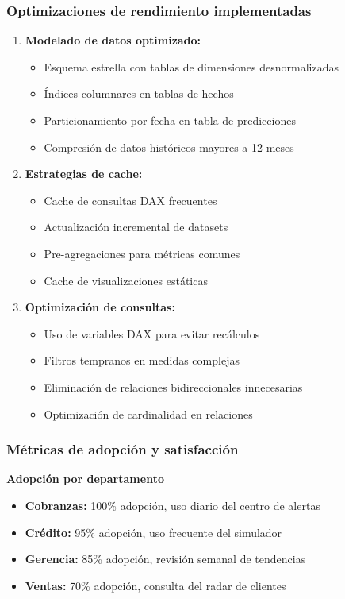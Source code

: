 \subsubsection{Optimizaciones de rendimiento implementadas}

\begin{enumerate}
    \item \textbf{Modelado de datos optimizado:}
    \begin{itemize}
        \item Esquema estrella con tablas de dimensiones desnormalizadas
        \item Índices columnares en tablas de hechos
        \item Particionamiento por fecha en tabla de predicciones
        \item Compresión de datos históricos mayores a 12 meses
    \end{itemize}
    
    \item \textbf{Estrategias de cache:}
    \begin{itemize}
        \item Cache de consultas DAX frecuentes
        \item Actualización incremental de datasets
        \item Pre-agregaciones para métricas comunes
        \item Cache de visualizaciones estáticas
    \end{itemize}
    
    \item \textbf{Optimización de consultas:}
    \begin{itemize}
        \item Uso de variables DAX para evitar recálculos
        \item Filtros tempranos en medidas complejas
        \item Eliminación de relaciones bidireccionales innecesarias
        \item Optimización de cardinalidad en relaciones
    \end{itemize}
\end{enumerate}

\subsubsection{Métricas de adopción y satisfacción}

\textbf{Adopción por departamento}
\begin{itemize}
    \item \textbf{Cobranzas:} 100\% adopción, uso diario del centro de alertas
    \item \textbf{Crédito:} 95\% adopción, uso frecuente del simulador
    \item \textbf{Gerencia:} 85\% adopción, revisión semanal de tendencias
    \item \textbf{Ventas:} 70\% adopción, consulta del radar de clientes
\end{itemize}

